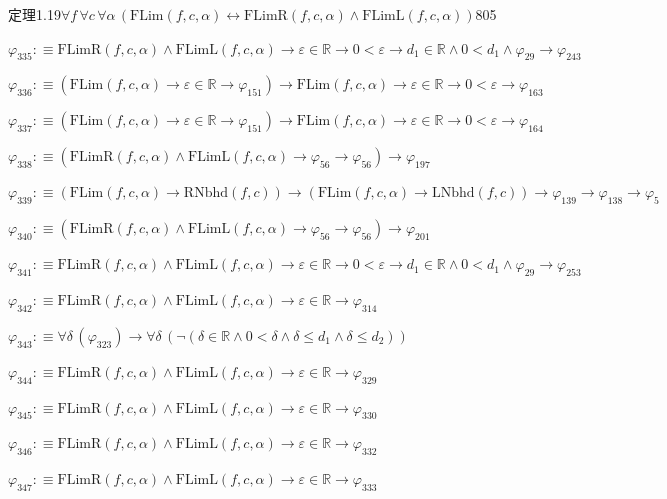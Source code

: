 \begin{fullproof}{定理1.19}{$\forall f\,\forall c\,\forall \alpha\,(\mathrm{FLim}(f,c,\alpha) \leftrightarrow \mathrm{FLimR}(f,c,\alpha) \land \mathrm{FLimL}(f,c,\alpha))$}{805}
\begin{abbrevlist}
\item $\varphi_{335} :\equiv \mathrm{FLimR}(f,c,\alpha) \land \mathrm{FLimL}(f,c,\alpha) \to \varepsilon \in \mathbb{R} \to 0 < \varepsilon \to d_{1} \in \mathbb{R} \land 0 < d_{1} \land \varphi_{29} \to \varphi_{243}$
\item $\varphi_{336} :\equiv (\mathrm{FLim}(f,c,\alpha) \to \varepsilon \in \mathbb{R} \to \varphi_{151}) \to \mathrm{FLim}(f,c,\alpha) \to \varepsilon \in \mathbb{R} \to 0 < \varepsilon \to \varphi_{163}$
\item $\varphi_{337} :\equiv (\mathrm{FLim}(f,c,\alpha) \to \varepsilon \in \mathbb{R} \to \varphi_{151}) \to \mathrm{FLim}(f,c,\alpha) \to \varepsilon \in \mathbb{R} \to 0 < \varepsilon \to \varphi_{164}$
\item $\varphi_{338} :\equiv (\mathrm{FLimR}(f,c,\alpha) \land \mathrm{FLimL}(f,c,\alpha) \to \varphi_{56} \to \varphi_{56}) \to \varphi_{197}$
\item $\varphi_{339} :\equiv (\mathrm{FLim}(f,c,\alpha) \to \mathrm{RNbhd}(f,c)) \to (\mathrm{FLim}(f,c,\alpha) \to \mathrm{LNbhd}(f,c)) \to \varphi_{139} \to \varphi_{138} \to \varphi_{5}$
\item $\varphi_{340} :\equiv (\mathrm{FLimR}(f,c,\alpha) \land \mathrm{FLimL}(f,c,\alpha) \to \varphi_{56} \to \varphi_{56}) \to \varphi_{201}$
\item $\varphi_{341} :\equiv \mathrm{FLimR}(f,c,\alpha) \land \mathrm{FLimL}(f,c,\alpha) \to \varepsilon \in \mathbb{R} \to 0 < \varepsilon \to d_{1} \in \mathbb{R} \land 0 < d_{1} \land \varphi_{29} \to \varphi_{253}$
\item $\varphi_{342} :\equiv \mathrm{FLimR}(f,c,\alpha) \land \mathrm{FLimL}(f,c,\alpha) \to \varepsilon \in \mathbb{R} \to \varphi_{314}$
\item $\varphi_{343} :\equiv \forall \delta\,(\varphi_{323}) \to \forall \delta\,(\neg (\delta \in \mathbb{R} \land 0 < \delta \land \delta \leq d_{1} \land \delta \leq d_{2}))$
\item $\varphi_{344} :\equiv \mathrm{FLimR}(f,c,\alpha) \land \mathrm{FLimL}(f,c,\alpha) \to \varepsilon \in \mathbb{R} \to \varphi_{329}$
\item $\varphi_{345} :\equiv \mathrm{FLimR}(f,c,\alpha) \land \mathrm{FLimL}(f,c,\alpha) \to \varepsilon \in \mathbb{R} \to \varphi_{330}$
\item $\varphi_{346} :\equiv \mathrm{FLimR}(f,c,\alpha) \land \mathrm{FLimL}(f,c,\alpha) \to \varepsilon \in \mathbb{R} \to \varphi_{332}$
\item $\varphi_{347} :\equiv \mathrm{FLimR}(f,c,\alpha) \land \mathrm{FLimL}(f,c,\alpha) \to \varepsilon \in \mathbb{R} \to \varphi_{333}$

\end{abbrevlist}
\end{fullproof}
